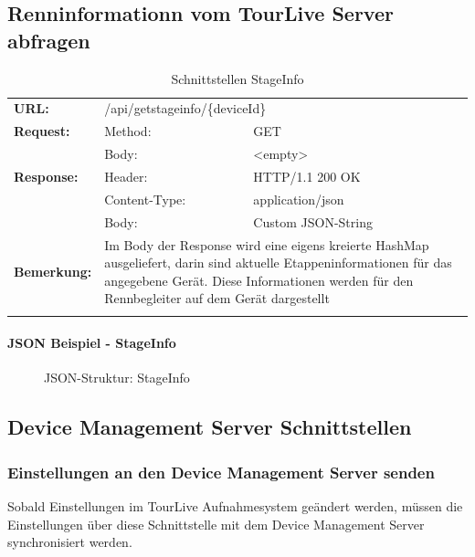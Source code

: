 \subsection{Renninformationn vom TourLive Server abfragen}
\begin{longtable}{ p{2.5cm} p{3.5cm} p{6cm}}
	\textbf{URL:} & \multicolumn{2}{p{10cm}}{/api/getstageinfo/\{deviceId\}} \\
	\textbf{Request:} & Method: & GET \\
		& Body: & <empty>\\	
	\textbf{Response:} & Header: & HTTP/1.1 200 OK \\
		& Content-Type: & application/json \\
		& Body: & Custom JSON-String \\	
	\textbf{Bemerkung:} & \multicolumn{2}{p{10cm}}{Im Body der Response wird eine eigens kreierte HashMap ausgeliefert, darin sind aktuelle Etappeninformationen für das angegebene Gerät. Diese Informationen werden für den Rennbegleiter auf dem Gerät dargestellt} \\ [1ex] 
\caption{Schnittstellen StageInfo}
\end{longtable}

\paragraph{JSON Beispiel - StageInfo}
\begin{figure}[H]
	\centering
	
	\caption{JSON-Struktur: StageInfo}
\end{figure}

\subsection{Device Management Server Schnittstellen}

\subsubsection{Einstellungen an den Device Management Server senden}
Sobald  Einstellungen im TourLive Aufnahmesystem geändert werden, müssen die Einstellungen über diese Schnittstelle mit dem Device Management Server synchronisiert werden.

